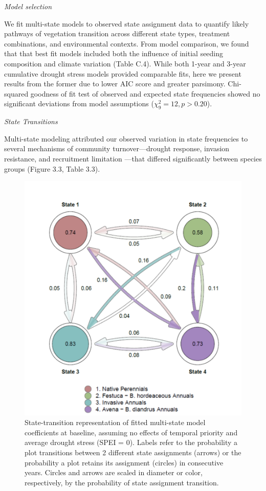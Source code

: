 \documentclass[twoside,12pt,final]{ucthesis-CA2012}
\begin{document}
\begin{ucmainmatter}
\emph{Model selection}

We fit multi-state models to observed state assignment data to quantify likely pathways of vegetation transition across different state types, treatment combinations, and environmental contexts.
From model comparison, we found that that best fit models included both the influence of initial seeding composition and climate variation (Table C.4).
While both 1-year and 3-year cumulative drought stress models provided comparable fits, here we present results from the former due to lower AIC score and greater parsimony.
Chi-squared goodness of fit test of observed and expected state frequencies showed no significant deviations from model assumptions (\(\chi_9^2 = 12, p > 0.20\)).

\emph{State Transitions}

Multi-state modeling attributed our observed variation in state frequencies to several mechanisms of community turnover---drought response, invasion resistance, and recruitment limitation ---that differed significantly between species groups (Figure 3.3, Table 3.3).
\begin{figure}
\centering
\includegraphics[width=1\textwidth,height=0.8\textheight]{figure/Fig3_3.png}
\caption{State-transition representation of fitted multi-state model coefficients at baseline, assuming no effects of temporal priority and average drought stress (SPEI = 0). Labels refer to the probability a plot transitions between 2 different state assignments (arrows) or the probability a plot retains its assignment (circles) in consecutive years. Circles and arrows are scaled in diameter or color, respectively, by the probability of state assignment transition. \label{fig-3-3}}

\end{figure}
\end{ucmainmatter}
\end{document}
